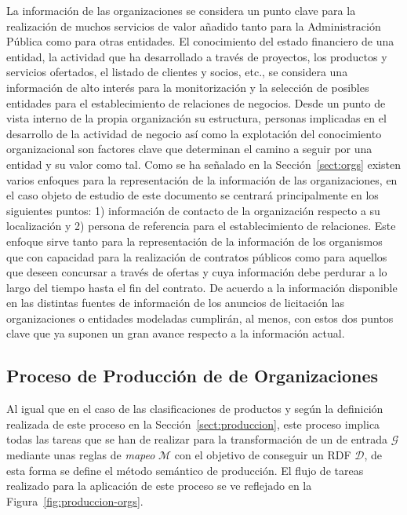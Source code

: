 La información de las organizaciones se considera un punto clave para la realización 
de muchos servicios de valor añadido tanto para la Administración Pública como 
para otras entidades. El conocimiento del estado financiero de una entidad, la actividad que ha desarrollado a 
través de proyectos, los productos y servicios ofertados, el listado de clientes y socios, etc., se considera una 
información de alto interés para la monitorización y la selección de posibles entidades 
para el establecimiento de relaciones de negocios. Desde un punto de vista interno de la propia organización su estructura, 
personas implicadas en el desarrollo de la actividad de negocio así como la explotación del conocimiento organizacional 
son factores clave que determinan el camino a seguir por una entidad y su valor como tal. Como se ha señalado 
en la Sección~\ref{sect:orgs} existen varios enfoques para la representación de la información de las organizaciones, 
en el caso objeto de estudio de este documento se centrará principalmente en los siguientes puntos: 1) información 
de contacto de la organización respecto a su localización y 2) persona de referencia para el establecimiento de 
relaciones. Este enfoque sirve tanto para la representación de la información de los organismos que con capacidad 
para la realización de contratos públicos como para aquellos que deseen concursar a través de ofertas y cuya información 
debe perdurar a lo largo del tiempo hasta el fin del contrato. De acuerdo a la información disponible en las distintas 
fuentes de información de los anuncios de licitación las organizaciones o entidades modeladas cumplirán, al menos, con estos 
dos puntos clave que ya suponen un gran avance respecto a la información actual.

\subsection{Proceso de Producción de \linkeddata de Organizaciones}
Al igual que en el caso de las clasificaciones de productos y según la definición realizada 
de este proceso en la Sección~\ref{sect:produccion}, este proceso implica todas las tareas 
que se han de realizar para la transformación de un \dataset de entrada $\mathcal{G}$ mediante 
unas reglas de \textit{mapeo} $\mathcal{M}$ con el objetivo de conseguir un \dataset \gls{RDF} $\mathcal{D}$, de esta forma 
se define el método semántico de producción. El flujo de tareas realizado para la aplicación de este proceso 
se ve reflejado en la Figura~\ref{fig:produccion-orgs}.

